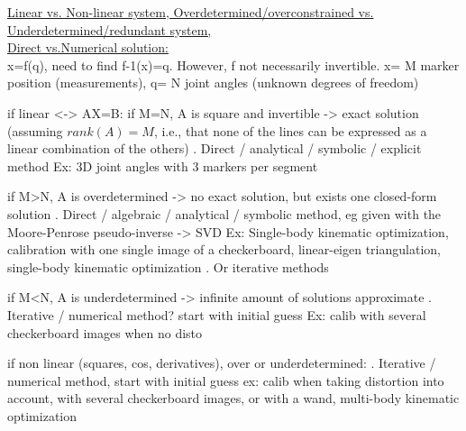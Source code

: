 


\vspace*{0.5cm}

\noindent\underline{Linear vs. Non-linear system, Overdetermined/overconstrained vs. Underdetermined/redundant system, \\Direct vs.Numerical solution:}\\


x=f(q), need to find f-1(x)=q. However, f not necessarily invertible. x= M marker position (measurements), q= N joint angles (unknown degrees of freedom)

if linear <-> AX=B: 
      if M=N, A is square and invertible -> exact solution (assuming $rank(A)=M$, i.e., that none of the lines can be expressed as a linear combination of the others)
      . Direct / analytical / symbolic / explicit method
      Ex: 3D joint angles with 3 markers per segment

      if M>N, A is overdetermined -> no exact solution, but exists one closed-form solution 
      . Direct / algebraic / analytical / symbolic method, eg given with the Moore-Penrose pseudo-inverse -> SVD  
      Ex: Single-body kinematic optimization, calibration with one single image of a checkerboard, linear-eigen triangulation, single-body kinematic optimization
      . Or iterative methods

      if M<N, A is underdetermined -> infinite amount of solutions approximate
      . Iterative / numerical method? start with initial guess
      Ex: calib with several checkerboard images when no disto

if non linear (squares, cos, derivatives), over or underdetermined:
      . Iterative / numerical method, start with initial guess
      ex: calib when taking distortion into account, with several checkerboard images, or with a wand, 
      multi-body kinematic optimization



